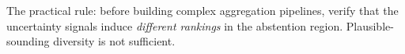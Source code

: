 \documentclass[conference]{IEEEtran}
\begin{document}
The practical rule: before building complex aggregation pipelines, verify that the uncertainty signals induce \emph{different rankings} in the abstention region. Plausible-sounding diversity is not sufficient.



\end{document}
